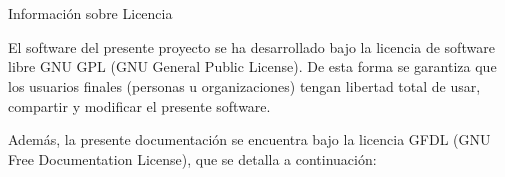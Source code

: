


\chapter*{}

 \begin{center}

       Información sobre Licencia


\end{center}

El software del presente proyecto se ha desarrollado bajo la licencia de
software libre GNU GPL (GNU General Public License). De esta forma se garantiza
que los usuarios finales (personas u organizaciones) tengan libertad total de
usar, compartir y modificar el presente software.

Además, la presente documentación se encuentra bajo la licencia GFDL (GNU Free
Documentation License), que se detalla a continuación:

